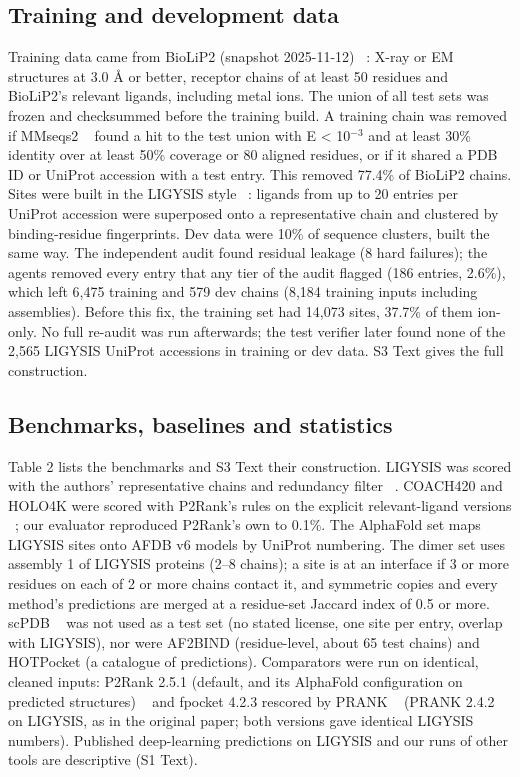\documentclass[10pt,letterpaper]{article}
\begin{document}
\subsection*{Training and development data}

Training data came from BioLiP2 (snapshot 2025-11-12) ~\cite{zhang2024}: X-ray or EM structures at 3.0 \AA{} or better, receptor chains of at least 50 residues and BioLiP2's relevant ligands, including metal ions. The union of all test sets was frozen and checksummed before the training build. A training chain was removed if MMseqs2 ~\cite{steinegger2017} found a hit to the test union with E \textless{} 10$^{-3}$ and at least 30\% identity over at least 50\% coverage or 80 aligned residues, or if it shared a PDB ID or UniProt accession with a test entry. This removed 77.4\% of BioLiP2 chains. Sites were built in the LIGYSIS style ~\cite{utges2024}: ligands from up to 20 entries per UniProt accession were superposed onto a representative chain and clustered by binding-residue fingerprints. Dev data were 10\% of sequence clusters, built the same way. The independent audit found residual leakage (8 hard failures); the agents removed every entry that any tier of the audit flagged (186 entries, 2.6\%), which left 6,475 training and 579 dev chains (8,184 training inputs including assemblies). Before this fix, the training set had 14,073 sites, 37.7\% of them ion-only. No full re-audit was run afterwards; the test verifier later found none of the 2,565 LIGYSIS UniProt accessions in training or dev data. S3 Text gives the full construction.

\subsection*{Benchmarks, baselines and statistics}

Table 2 lists the benchmarks and S3 Text their construction. LIGYSIS was scored with the authors' representative chains and redundancy filter ~\cite{utges2024}. COACH420 and HOLO4K were scored with P2Rank's rules on the explicit relevant-ligand versions ~\cite{krivak2018}; our evaluator reproduced P2Rank's own to 0.1\%. The AlphaFold set maps LIGYSIS sites onto AFDB v6 models by UniProt numbering. The dimer set uses assembly 1 of LIGYSIS proteins (2--8 chains); a site is at an interface if 3 or more residues on each of 2 or more chains contact it, and symmetric copies and every method's predictions are merged at a residue-set Jaccard index of 0.5 or more. scPDB ~\cite{desaphy2015} was not used as a test set (no stated license, one site per entry, overlap with LIGYSIS), nor were AF2BIND (residue-level, about 65 test chains) and HOTPocket (a catalogue of predictions). Comparators were run on identical, cleaned inputs: P2Rank 2.5.1 (default, and its AlphaFold configuration on predicted structures) ~\cite{krivak2018} and fpocket 4.2.3 rescored by PRANK ~\cite{leguilloux2009,krivak2015} (PRANK 2.4.2 on LIGYSIS, as in the original paper; both versions gave identical LIGYSIS numbers). Published deep-learning predictions on LIGYSIS and our runs of other tools are descriptive (S1 Text).
\end{document}
